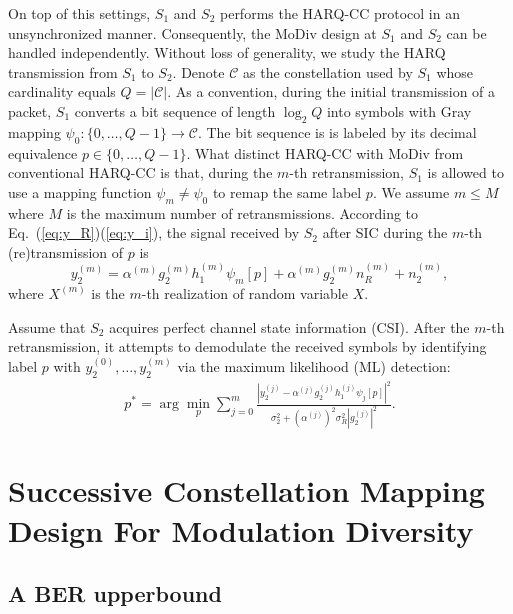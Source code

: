 \documentclass{article}
\begin{document}
On top of this settings, $S_1$ and $S_2$ performs the HARQ-CC protocol
in an unsynchronized manner. Consequently, the MoDiv design at $S_1$ and $S_2$
can be handled independently. Without loss of generality, we study the HARQ
transmission from $S_1$ to $S_2$. Denote $\mathcal{C}$ as the constellation used
by $S_1$ whose cardinality equals $Q=|\mathcal{C}|$. As a convention, during the
initial transmission of a packet, $S_1$ converts a bit sequence of length
$\log_2Q$ into symbols with Gray mapping $\psi_0:\{0,\ldots,Q - 1\}\rightarrow
\mathcal{C}$. The bit sequence is is labeled by its decimal equivalence $p\in
\{0,\ldots,Q - 1\}$. What distinct HARQ-CC with MoDiv from conventional HARQ-CC
is that, during the $m$-th retransmission, $S_1$ is allowed to use a
mapping function $\psi_m\not=\psi_0$ to remap the same label $p$. We assume
$m \leq M$ where $M$ is the maximum number of retransmissions. According to
Eq.~(\ref{eq:y_R})(\ref{eq:y_i}), the signal received by $S_2$ after SIC during
the $m$-th (re)transmission of $p$ is
\begin{equation}
  y_2^{(m)} = \alpha^{(m)} g_2^{(m)}h_1^{(m)}\psi_m[p] +
  \alpha^{(m)} g_2^{(m)}n_R^{(m)} + n_2^{(m)},
\end{equation}
where $X^{(m)}$ is the $m$-th realization of random variable $X$.

Assume that $S_2$ acquires perfect channel state information
(CSI). After the $m$-th retransmission, it attempts to demodulate the received symbols by
identifying label $p$ with $y_2^{(0)},\ldots,y_2^{(m)}$ via the maximum
likelihood (ML) detection:
\begin{align}
  p^* = \arg\min_p\sum_{j=0}^{m} \frac{|y_2^{(j)} -
  \alpha^{(j)} g_2^{(j)} h_1^{(j)}\psi_j[p]|^2}
  {\sigma_2^2+(\alpha^{(j)})^2\sigma_R^2|g_2^{(j)}|^2}.
\end{align}

\section{Successive Constellation Mapping Design For Modulation Diversity}
\label{sec:modiv}

\subsection{A BER upperbound}
\label{ssec:ber}

\end{document}
